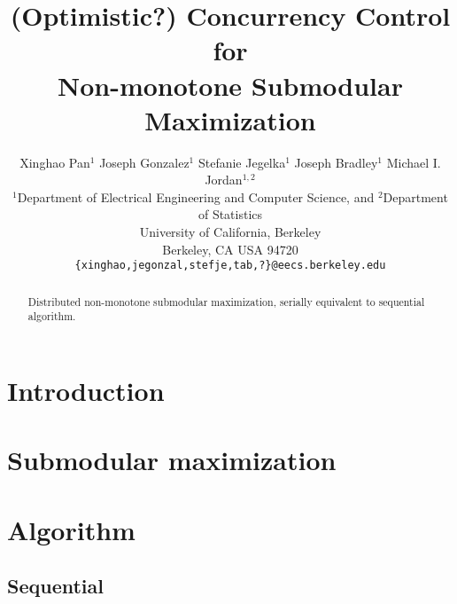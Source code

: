 \documentclass{article} %
\title{(Optimistic?) Concurrency Control for \\ Non-monotone Submodular Maximization}
\author{
Xinghao Pan$^1$ Joseph Gonzalez$^1$ Stefanie Jegelka$^1$ Joseph Bradley$^{1}$ Michael I. Jordan$^{1,2}$\\
$^1$Department of Electrical Engineering and Computer Science, and $^2$Department of Statistics\\
University of California, Berkeley\\
Berkeley, CA USA 94720\\
  \texttt{\{xinghao,jegonzal,stefje,tab,?\}@eecs.berkeley.edu} \\
}
\begin{document}
\maketitle


\begin{abstract}
Distributed non-monotone submodular maximization, serially equivalent to sequential algorithm.
\end{abstract}

\section{Introduction}

\section{Submodular maximization}

\section{Algorithm}
\subsection{Sequential}
\end{document}
